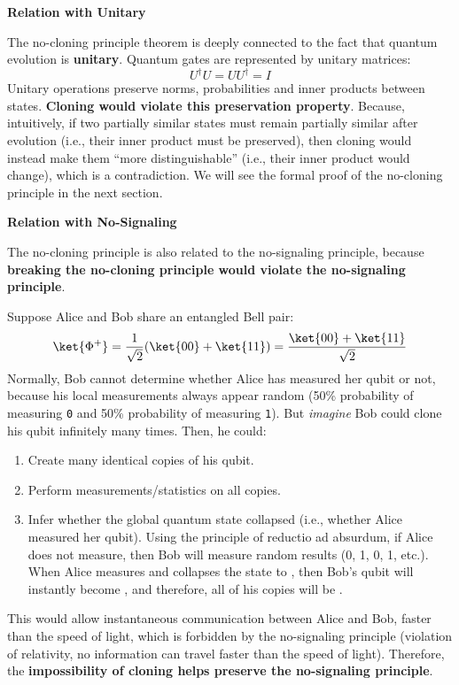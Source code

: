 \highspace
\begin{flushleft}
    \textcolor{Red2}{ \textbf{Relation with Unitary}}
\end{flushleft}
The no-cloning principle theorem is deeply connected to the fact that quantum evolution is \textbf{unitary}. Quantum gates are represented by unitary matrices:
\begin{equation*}
    U^\dagger U = U U^\dagger = I
\end{equation*}
Unitary operations preserve norms, probabilities and inner products between states. \textbf{Cloning would violate this preservation property}. Because, intuitively, if two partially similar states must remain partially similar after evolution (i.e., their inner product must be preserved), then cloning would instead make them ``more distinguishable'' (i.e., their inner product would change), which is a contradiction. We will see the formal proof of the no-cloning principle in the next section.

\highspace
\begin{flushleft}
    \textcolor{Red2}{ \textbf{Relation with No-Signaling}}
\end{flushleft}
The no-cloning principle is also related to the no-signaling principle, because \textbf{breaking the no-cloning principle would violate the no-signaling principle}.

\highspace
Suppose Alice and Bob share an entangled Bell pair:
\begin{equation*}
    \ket{\Phi^+} = \frac{1}{\sqrt{2}}(\ket{00} + \ket{11}) = \frac{\ket{00} + \ket{11}}{\sqrt{2}}
\end{equation*}
Normally, Bob cannot determine whether Alice has measured her qubit or not, because his local measurements always appear random (50\% probability of measuring \texttt{0} and 50\% probability of measuring \texttt{1}). But \emph{imagine} Bob could clone his qubit infinitely many times. Then, he could:
\begin{enumerate}
    \item Create many identical copies of his qubit.
    \item Perform measurements/statistics on all copies.
    \item Infer whether the global quantum state collapsed (i.e., whether Alice measured her qubit). Using the principle of reductio ad absurdum, if Alice does not measure, then Bob will measure random results (0, 1, 0, 1, etc.). When Alice measures and collapses the state to , then Bob's qubit will instantly become , and therefore, all of his copies will be .
\end{enumerate}
This would allow instantaneous communication between Alice and Bob, faster than the speed of light, which is forbidden by the no-signaling principle (violation of relativity, no information can travel faster than the speed of light). Therefore, the \textbf{impossibility of cloning helps preserve the no-signaling principle}.

